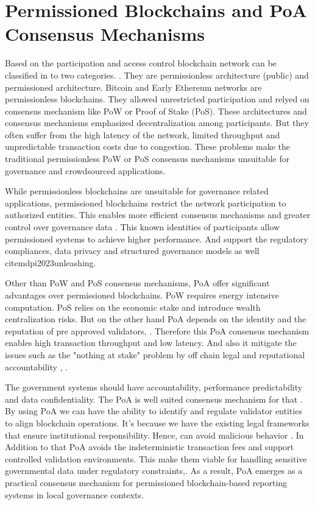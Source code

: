 \section{Permissioned Blockchains and \ac{PoA} Consensus Mechanisms}

Based on the participation and access control blockchain network can be classified in to two categories.  \cite{und2026commledger}. They are permissionless architecture (public) and permissioned architecture. Bitcoin and Early Ethereum networks are permissionless blockchains. They allowed unrestricted participation and relyed on consensus mechanism like \ac{PoW} or Proof of Stake (\ac{PoS})\cite{mdpi2023survey}. These architectures and consensus mechanisms emphasized decentralization among participants. But they often suffer from the high latency of the network, limited throughput and unpredictable transaction costs due to congestion. These problems make the traditional permissionless PoW or PoS consensus mechanisms unsuitable for governance and crowdsourced applications\cite{arxiv2024performance}.

While permissionless blockchains are unsuitable for governance related applications, permissioned blockchains restrict the network participation to authorized entities. This enables more efficient consensus mechanisms and greater control over governance data \cite{und2026commledger}. This known identities of participants allow permissioned systems to achieve higher performance. And support the regulatory compliances, data privacy and structured governance models as well cite{mdpi2023unleashing}.

Other than \ac{PoW} and \ac{PoS} consensus mechanisms, \ac{PoA} offer significant advantages over permissioned blockchains. \ac{PoW} requires energy intensive computation. \ac{PoS} relies on the economic stake and introduce wealth centralization risks. But on the other hand \ac{PoA} depends on the identity and the reputation of pre approved validators\cite{researchgate2020survey}, \cite{zebpay2026poa}. Therefore this \ac{PoA} consensus mechanism enables high transaction throughput and low latency. And also it mitigate the issues such as the "nothing at stake" problem by off chain legal and reputational accountability \cite{echo2026poa}, \cite{grokipedia2026poa}.

The government systems should have accountability, performance predictability and data confidentiality. The \ac{PoA} is well suited consensus mechanism for that \cite{onekey2026poa}. By using \ac{PoA} we can have the ability to identify and regulate validator entities to align blockchain operations. It's because we have the existing legal frameworks that ensure institutional responsibility. Hence, can avoid malicious behavior \cite{hep2023governance}. In Addition to that PoA avoids the indeterministic transaction fees and support controlled validation environments. This make them viable for handling sensitive governmental data under regulatory constraints\cite{zebpay2026poa},\cite{mdpi2023unleashing}. As a result, \ac{PoA} emerges as a practical consensus mechanism for permissioned blockchain-based reporting systems in local governance contexts.

